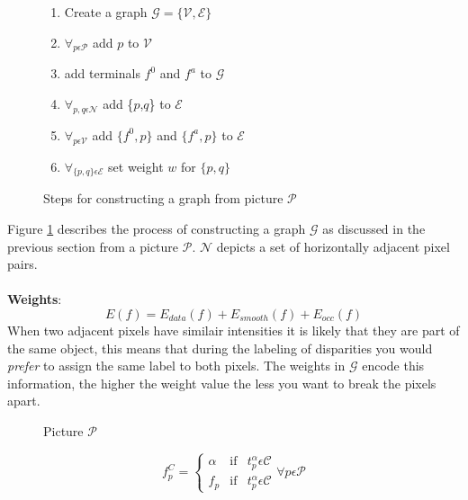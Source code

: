 \documentclass[a4paper]{article}
\begin{document}
\begin{figure}[t]
\begin{enumerate}
 \item Create a graph $\mathcal{G} = \{\mathcal{V},\mathcal{E}\}$
 \item $\forall_{p \epsilon \mathcal{P}}$ add $p$ to $\mathcal{V}$
 \item add terminals $f^0$ and $f^a$ to $\mathcal{G}$
 \item $\forall_{p,q \epsilon \mathcal{N}}$ add \{$p$,$q$\} to $\mathcal{E}$
 \item $\forall_{p \epsilon \mathcal{V}}$ add $\{f^0,p\}$ and $\{f^a,p\}$ to $\mathcal{E}$
 \item $\forall_{\{p,q\} \epsilon \mathcal{E}}$ set weight $w$ for $\{p,q\}$
\end{enumerate}
\caption{Steps for constructing a graph from picture $\mathcal{P}$}
\label{alg:gc_construct}
\end{figure}
Figure \ref{alg:gc_construct} describes the process of constructing a graph $\mathcal{G}$ as discussed in the previous section
 from a picture $\mathcal{P}$. $\mathcal{N}$ depicts a set of horizontally adjacent pixel pairs.\\\\
\noindent\textbf{Weights}:\indent\\
\begin{equation}
 E(f) = E_{data}(f) + E_{smooth}(f) + E_{occ}(f)
\end{equation}
When two adjacent pixels have similair intensities it is likely that they are part of the same object, this means
that during the labeling of disparities you would \emph{prefer} to assign the same label to both pixels.
The weights in $\mathcal{G}$ encode this information, the higher the weight value the less you want to break the pixels apart.
 

\begin{figure}[t]
\centering
\caption{Picture $\mathcal{P}$}
\begin{minipage}[h]{.4\linewidth}

\end{minipage}
\hspace{.1\linewidth}
\begin{minipage}[h]{.4\linewidth}

\end{minipage}
\end{figure}
\begin{equation}
 f_{p}^{C} = \left\{
  \begin{array}{lll}
  \alpha & \text{if} & t^{\alpha}_{p} \epsilon \mathcal{C} \\ 
  f_{p}  & \text{if} & t^{\alpha}_{p} \epsilon \mathcal{C}
  \end{array}
\right.
 \forall p \epsilon \mathcal{P}
\end{equation}
\end{document}
